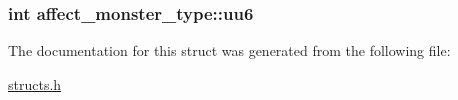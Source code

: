 \hypertarget{structaffect__monster__type_a08082a9e069912f4add89f125ae1e1e7}{
\subsubsection[{uu6}]{\setlength{\rightskip}{0pt plus 5cm}int affect\-\_\-monster\-\_\-type\-::uu6}}\label{structaffect__monster__type_a08082a9e069912f4add89f125ae1e1e7}


The documentation for this struct was generated from the following file\-:\begin{DoxyCompactItemize}
\item 
\hyperlink{structs_8h}{structs.\-h}\end{DoxyCompactItemize}
